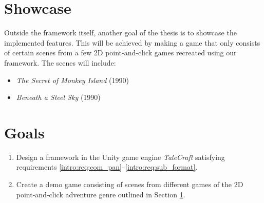 \section{Showcase}
\label{intro:showcase}
Outside the framework itself, another goal of the thesis is to showcase the implemented features. This will be achieved by making a game that only consists of certain scenes from a few 2D point-and-click games recreated using our framework. The scenes will include:
\begin{itemize}
    \item \textit{The Secret of Monkey Island} (1990)
    \item \textit{Beneath a Steel Sky} (1990)
\end{itemize}

\section{Goals}
\label{intro:goals}
\begin{enumerate}[label=\color{orange}\textbf{G{\arabic*}}]
  \item \label{intro:goals:framework} 
  Design a framework in the Unity game engine \textit{TaleCraft} satisfying requirements \ref{intro:req:com_pan}--\ref{intro:req:sub_format}.
  \item \label{intro:goals:demo} Create a demo game consisting of scenes from different games of the 2D point-and-click adventure genre outlined in Section \ref{intro:showcase}.
\end{enumerate}
